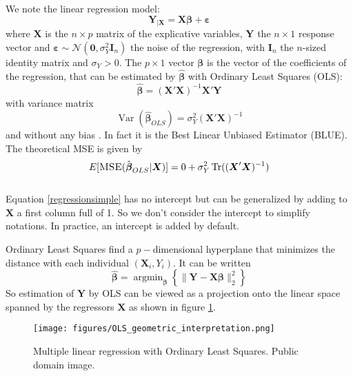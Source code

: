 \documentclass[12pt,a4paper]{report}
\begin{document}
We note the linear regression model:
\begin{equation}
		\boldsymbol{Y}_{|\boldsymbol{X}}=\boldsymbol{X}\boldsymbol{\beta} + \boldsymbol{\varepsilon} \label{regressionsimple}
	\end{equation}
	where $\boldsymbol{X}$ is the $n\times p$ matrix of the explicative variables,%
	 $\boldsymbol{Y}$ the  $n\times 1$ response vector and $\boldsymbol{\varepsilon} \sim \mathcal{N}(\boldsymbol{0},\sigma_Y^2\boldsymbol{I}_n)$ the noise of the regression, with $\boldsymbol{I}_n$ the $n$-sized identity matrix and $\sigma_Y >0$. The $p\times 1$ vector $\boldsymbol{\beta}$ is the vector of the coefficients of the regression, that can be estimated by $\hat{\boldsymbol{\beta}}$ with Ordinary Least Squares (\textsc{OLS}): %
	\begin{equation}
		\boldsymbol{\hat{\beta}}=\left(\boldsymbol{X}'\boldsymbol{X} \right) ^{-1}\boldsymbol{X}'\boldsymbol{Y}\label{betaOLS}
	\end{equation}
	with variance matrix
	\begin{equation}
		\operatorname{Var}(\hat{\boldsymbol{\beta}}_{OLS})=\sigma_Y^2\left(\boldsymbol{X}'\boldsymbol{X} \right) ^{-1} \label{eqOLS}
	\end{equation}
	and without any bias \cite{saporta2006probabilites,dodge2004analyse}. In fact it is the Best Linear Unbiased Estimator (BLUE).
	The theoretical MSE is given by
	\begin{equation}
	E[\textsc{MSE}(\hat{\boldsymbol{\beta}}_{OLS}|\boldsymbol{X})]= 0 + \sigma_Y^2 \operatorname{Tr}((\boldsymbol{X}'\boldsymbol{X})^{-1})
	\end{equation}
	\\
	Equation \ref{regressionsimple}	has no intercept but can be generalized by adding to $\boldsymbol{X}$ a first column full of 1. So we don't consider the intercept to simplify notations. In practice, an intercept is added by default.
	
	Ordinary Least Squares find a $p-$dimensional hyperplane that minimizes the distance with each individual $(\boldsymbol{X}_i,Y_i)$. It can be written
	\begin{equation}
		\boldsymbol{\hat{\beta}}=\operatorname{argmin}_{\boldsymbol{\beta}}\left\lbrace \parallel \boldsymbol{Y}-\boldsymbol{X\beta}\parallel_2^2 \right\rbrace
	\end{equation}
	So estimation of $\boldsymbol{Y}$ by OLS can be viewed as a projection onto the linear space spanned by the regressors $\boldsymbol{X}$ as shown in figure \ref{geomOLS}.%
	\begin{figure}[h!]
	\centering
	\texttt{[image: figures/OLS\_geometric\_interpretation.png]}
	\caption{Multiple linear regression with Ordinary Least Squares. Public domain image.} \label{geomOLS}
	\end{figure}
	
\end{document}
